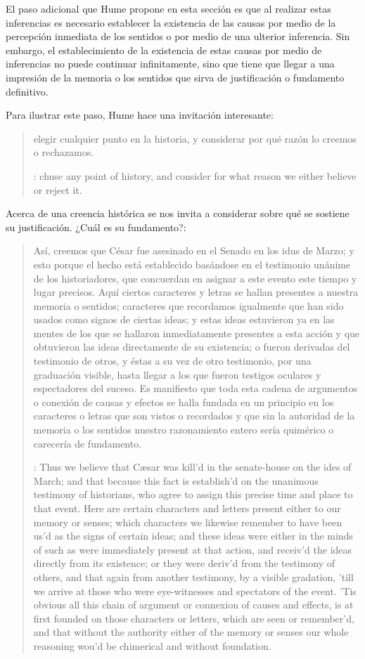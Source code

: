 El paso adicional que Hume propone en esta sección es que al realizar estas inferencias es necesario establecer la existencia de las causas por medio de la percepción inmediata de los sentidos o por medio de una ulterior inferencia. Sin embargo, el establecimiento de la existencia de estas causas por medio de inferencias no puede continuar infinitamente, sino que tiene que llegar a una impresión de la memoria o los sentidos que sirva de justificación o fundamento definitivo.

Para ilustrar este paso, Hume hace una invitación interesante: \blockquote[{\cite[?]{humetreatise}}: chuse any point of history, and consider for what reason we either believe or reject it.]{elegir cualquier punto en la historia, y considerar por qué razón lo creemos o rechazamos.} Acerca de una creencia histórica se nos invita a considerar sobre qué se sostiene su justificación. ¿Cuál es su fundamento?: \blockquote[{\cite[?]{humetratise}}: Thus we believe that Cæsar was kill’d in the senate-house on the ides of March; and that because this fact is establish’d on the unanimous testimony of historians, who agree to assign this precise time and place to that event. Here are certain characters and letters present either to our memory or senses; which characters we likewise remember to have been us’d as the signs of certain ideas; and these ideas were either in the minds of such as were immediately present at that action, and receiv’d the ideas directly from its existence; or they were deriv’d from the testimony of others, and that again from another testimony, by a visible gradation, ’till we arrive at those who were eye-witnesses and spectators of the event. ’Tis obvious all this chain of argument or connexion of causes and effects, is at first founded on those characters or letters, which are seen or remember’d, and that without the authority either of the memory or senses our whole reasoning wou’d be chimerical and without foundation.]{Así, creemos que César fue asesinado en el Senado en los idus de Marzo; y esto porque el hecho está establecido basándose en el testimonio unánime de los historiadores, que concuerdan en asignar a este evento este tiempo y lugar precisos. Aquí ciertos caracteres y letras se hallan presentes a nuestra memoria o sentidos; caracteres que recordamos igualmente que han sido usados como signos de ciertas ideas; y estas ideas estuvieron ya en las mentes de los que se hallaron inmediatamente presentes a esta acción y que obtuvieron las ideas directamente de su existencia; o fueron derivadas del testimonio de otros, y éstas a su vez de otro testimonio, por una graduación visible, hasta llegar a los que fueron testigos oculares y espectadores del suceso. Es manifiesto que toda esta cadena de argumentos o conexión de causas y efectos se halla fundada en un principio en los caracteres o letras que son vistos o recordados y que sin la autoridad de la memoria o los sentidos nuestro razonamiento entero sería quimérico o carecería de fundamento.}

